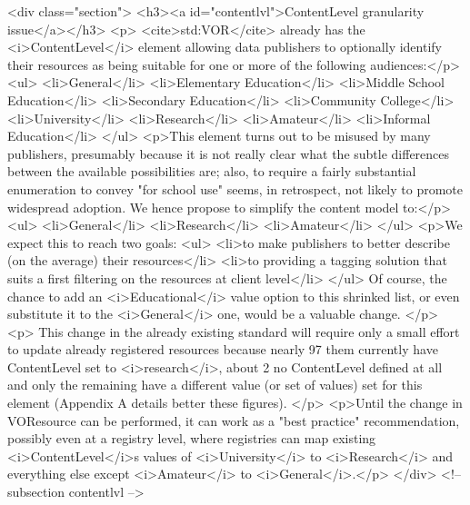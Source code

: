 <div class="section">
  <h3><a id="contentlvl">ContentLevel granularity issue</a></h3>
  <p>
  <cite>std:VOR</cite> already has the <i>ContentLevel</i> element
  allowing data publishers to optionally identify their resources as being 
  suitable for one or more of the following audiences:</p>
  <ul>
	<li>General</li>
	<li>Elementary Education</li>
	<li>Middle School Education</li>
	<li>Secondary Education</li>
	<li>Community College</li>
	<li>University</li>
	<li>Research</li>
	<li>Amateur</li>
	<li>Informal Education</li>
  </ul>
  <p>This element turns out to be misused by many publishers, presumably because
  it is not really clear what the subtle differences between the available
  possibilities are; also, to require a fairly substantial enumeration to
  convey "for school use" seems, in retrospect, not likely to promote
  widespread adoption. We hence propose to simplify the content model
  to:</p>
  <ul>
	<li>General</li>
	<li>Research</li>
	<li>Amateur</li>
  </ul>
  <p>We expect this to reach two goals:
  <ul>
    <li>to make publishers to better describe (on the average)
    their resources</li>
    <li>to providing a tagging solution that suits a first filtering 
    on the resources at client level</li>
  </ul>
  Of course, the chance to 
  add an <i>Educational</i> value option to this shrinked list, or even
  substitute it to the <i>General</i> one, would be a valuable change.
  </p>
  <p>
  This change in the already existing standard will require only 
  a small effort to update already registered resources because nearly 97%
  them currently have ContentLevel set to <i>research</i>, about 2%
  no ContentLevel defined at all and only the remaining have a different value
  (or set of values) set for this element (Appendix A details better these
  figures).
  </p>
  <p>Until the change in VOResource can be performed, it
  can work as a "best practice" recommendation, possibly even at a
  registry level, where registries can map existing <i>ContentLevel</i>s values 
  of <i>University</i> to <i>Research</i> and
  everything else except <i>Amateur</i> to <i>General</i>.</p>
</div> <!-- subsection contentlvl -->

